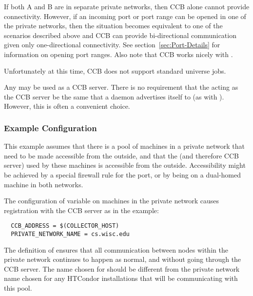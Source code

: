 If both A and B are in separate private networks, then CCB alone
cannot provide connectivity.  However, if an incoming port or port
range can be opened in one of the private networks, then the situation
becomes equivalent to one of the scenarios described above and CCB can
provide bi-directional communication given only one-directional
connectivity.  See section~\ref{sec:Port-Details} for information on
opening port ranges.  Also note that CCB works nicely with
.

Unfortunately at this time, CCB does not support standard universe jobs.

Any  may be used as a CCB server.  There is no
requirement that the  acting as the CCB server
be the same  that a daemon
advertises itself to (as with ).
However, this is often a convenient choice.

\subsubsection{Example Configuration}

This example assumes that there is a pool of machines in a private
network that need to be made accessible from the outside,
and that the  (and therefore CCB server)
used by these machines is accessible from the outside.
Accessibility might be achieved by
a special firewall rule for the  port,
or by being on a dual-homed machine in both networks.

The configuration of variable  on
machines in the private network causes registration with
the CCB server as in the example:

\begin{verbatim}
  CCB_ADDRESS = $(COLLECTOR_HOST)
  PRIVATE_NETWORK_NAME = cs.wisc.edu
\end{verbatim}

The definition of  ensures that all
communication between nodes within the private network continues to happen
as normal, and without going through the CCB server.
The name chosen for  should be different
from the private network name chosen for any HTCondor installations that
will be communicating with this pool.

